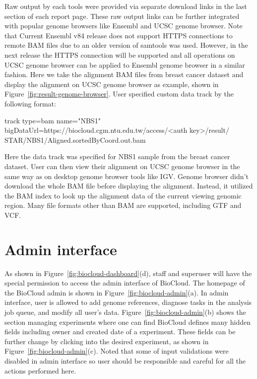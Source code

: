 

Raw output by each tools were provided via separate download links in the last
section of each report page. These raw output links can be further integrated
with popular genome browsers like Ensembl and UCSC genome browser. Note that
Current Ensembl v84 release does not support HTTPS connections to remote BAM
files due to an older version of samtools was used. However, in the next
release the HTTPS connection will be supported and all operations on UCSC
genome browser can be applied to Ensembl genome browser in a similar fashion.
Here we take the alignment BAM files from breast cancer dataset and display the
alignment on UCSC genome browser as example, shown in
Figure~\ref{fig:result-genome-browser}. User specified custom data track by the
following format:

\begin{CVerbatim}[fontsize=\small]
track type=bam name="NBS1"
bigDataUrl=https://biocloud.cgm.ntu.edu.tw/access/<auth key>/result/
STAR/NBS1/Aligned.sortedByCoord.out.bam
\end{CVerbatim}

\vspace{-1em}\noindent
Here the data track was specified for NBS1 sample from the breast cancer
dataset. User can then view their alignment on UCSC genome browser in the same
way as on desktop genome browser tools like IGV. Genome browser didn't download
the whole BAM file before displaying the alignment. Instead, it utilized the
BAM index to look up the alignment data of the current viewing genomic region.
Many file formats other than BAM are supported, including GTF and VCF.



\section{Admin interface}
\label{s:biocloud-admin}



As shown in Figure~\ref{fig:biocloud-dashboard}(d), staff and superuser will
have the special permission to access the admin interface of BioCloud. The
homepage of the BioCloud admin is shown in Figure~\ref{fig:biocloud-admin}(a).
In admin interface, user is allowed to add genome references, diagnose tasks in
the analysis job queue, and modify all user's data.
Figure~\ref{fig:biocloud-admin}(b) shows the section managing experiments where
one can find BioCloud defines many hidden fields including owner and created
date of a experiment. These fields can be further change by clicking into the
desired experiment, as shown in Figure~\ref{fig:biocloud-admin}(c). Noted that
some of input validations were disabled in admin interface so user should be
responsible and careful for all the actions performed here.

